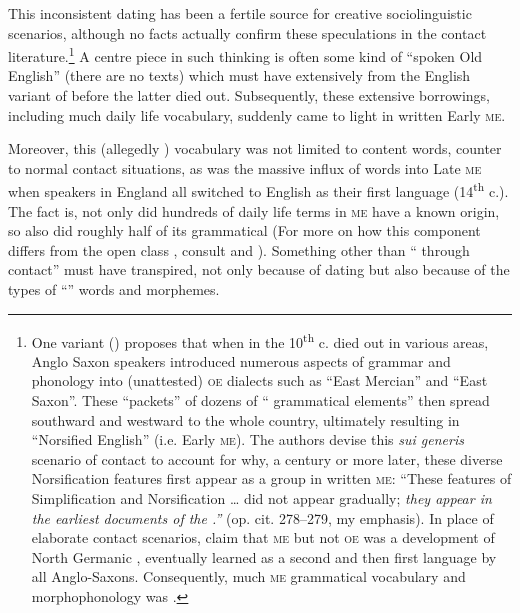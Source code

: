 \documentclass[output=paper]{LSP/langsci}
\begin{document}
This inconsistent dating has been a fertile source for creative sociolinguistic scenarios, although no facts actually confirm these speculations in the contact literature.\footnote{One variant (\citealt[286--287]{ThomasonKaufman1988}) proposes that when in the 10\textsuperscript{th} c.  died out in various areas, Anglo Saxon speakers introduced numerous aspects of  grammar and phonology into (unattested) \textsc{oe} dialects such as ``East Mercian'' and ``East Saxon''. These ``packets'' of dozens of `` grammatical elements'' then spread southward and westward to the whole country, ultimately resulting in ``Norsified English'' (i.e. Early \textsc{me}). The authors devise this \textit{sui generis} scenario of contact to account for why, a century or more later, these diverse Norsification features first appear as a group in written \textsc{me}: “These features of Simplification and Norsification … did not appear gradually; \textit{they appear in the earliest  documents of the .”} (op. cit. 278–279, my emphasis).   In place of elaborate contact scenarios,  \citet{EmondsFaarlund2014} claim that \textsc{me} but not \textsc{oe} was a development of North Germanic , eventually learned as a second and then first language by all Anglo-Saxons. Consequently, much \textsc{me} grammatical vocabulary and morphophonology was .} A centre piece in such thinking is often some kind of ``spoken Old English'' (there are no texts) which must have  extensively from the English variant of  before the latter died out. Subsequently, these extensive borrowings, including much daily life vocabulary, suddenly came to light in written Early \textsc{me}. 

Moreover, this (allegedly )  vocabulary was not limited to content words, counter to normal contact situations, as was the massive influx of  words into Late \textsc{me} when  speakers in England all switched to English as their first language (14\textsuperscript{th} c.). The fact is, not only did hundreds of daily life terms in \textsc{me} have a  known  origin, so also did roughly half of its grammatical  (For more on how this component differs from the open class , consult \citealt{Ouhalla1991} and \citealt[Chs. 3 and 4]{Emonds2000}). Something other than `` through contact'' must have transpired, not only because of dating but also because of the types of ``'' words and morphemes.
\end{document}
